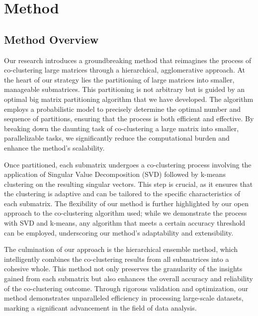 

\section{Method}

\subsection{Method Overview}

Our research introduces a groundbreaking method that reimagines the process of co-clustering large matrices through a hierarchical, agglomerative approach. At the heart of our strategy lies the partitioning of large matrices into smaller, manageable submatrices. This partitioning is not arbitrary but is guided by an optimal big matrix partitioning algorithm that we have developed. The algorithm employs a probabilistic model to precisely determine the optimal number and sequence of partitions, ensuring that the process is both efficient and effective. By breaking down the daunting task of co-clustering a large matrix into smaller, parallelizable tasks, we significantly reduce the computational burden and enhance the method's scalability.

Once partitioned, each submatrix undergoes a co-clustering process involving the application of Singular Value Decomposition (SVD) followed by k-means clustering on the resulting singular vectors. This step is crucial, as it ensures that the clustering is adaptive and can be tailored to the specific characteristics of each submatrix. The flexibility of our method is further highlighted by our open approach to the co-clustering algorithm used; while we demonstrate the process with SVD and k-means, any algorithm that meets a certain accuracy threshold can be employed, underscoring our method's adaptability and extensibility.

The culmination of our approach is the hierarchical ensemble method, which intelligently combines the co-clustering results from all submatrices into a cohesive whole. This method not only preserves the granularity of the insights gained from each submatrix but also enhances the overall accuracy and reliability of the co-clustering outcome. Through rigorous validation and optimization, our method demonstrates unparalleled efficiency in processing large-scale datasets, marking a significant advancement in the field of data analysis.

